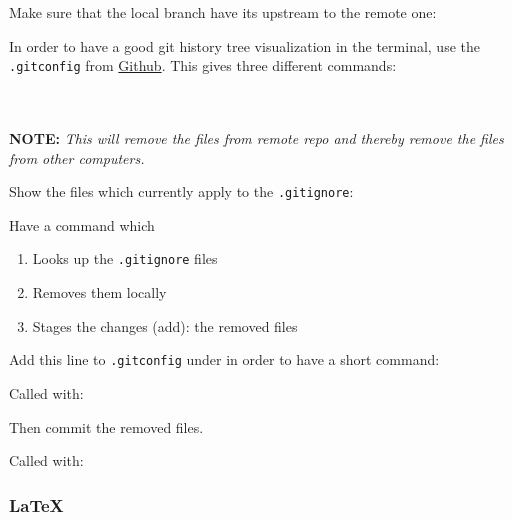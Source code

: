 
Make sure that the local branch have its upstream to the remote one:



In order to have a good git history tree visualization in the terminal, use the \texttt{.gitconfig} from \href{https://github.com/robinhellmers/computer_setup/blob/master/git_setup/gitconfig}{Github}. This gives three different commands:\\
\\
\\


\textbf{NOTE:} \textit{This will remove the files from remote repo and thereby remove the files from other computers.}

Show the files which currently apply to the \texttt{.gitignore}:


Have a command which 
\begin{enumerate}
    \item Looks up the \texttt{.gitignore} files
    \item Removes them locally
    \item Stages the changes (add): the removed files
\end{enumerate}

Add this line to \texttt{.gitconfig} under \code{[alias]} in order to have a short command:


Called with:


Then commit the removed files.\\




Called with:



\subsubsection{LaTeX}

